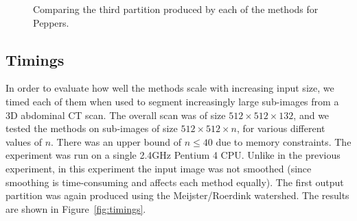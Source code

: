 \documentclass[review,a4paper]{elsarticle}
\newenvironment{stusubfig}[1]
{
	\begin{figure}[#1]
	\begin{center}
}
{
	\end{center}
	\end{figure}
}
\begin{document}
\begin{stusubfig}{p}
	\hspace{4mm}%
	\hspace{4mm}%
\caption[]{Comparing the third partition produced by each of the methods for Peppers.}
\label{fig:results-peppers}
\end{stusubfig}

\subsection{Timings}

In order to evaluate how well the methods scale with increasing input size, we timed each of them when used to segment increasingly large sub-images from a 3D abdominal CT scan\footnotemark{}. The overall scan was of size $512 \times 512 \times 132$, and we tested the methods on sub-images of size $512 \times 512 \times n$, for various different values of $n$. There was an upper bound of $n \le 40$ due to memory constraints. The experiment was run on a single 2.4GHz Pentium 4 CPU. Unlike in the previous experiment, in this experiment the input image was not smoothed (since smoothing is time-consuming and affects each method equally). The first output partition was again produced using the Meijster/Roerdink watershed. The results are shown in Figure~\ref{fig:timings}.
\end{document}

